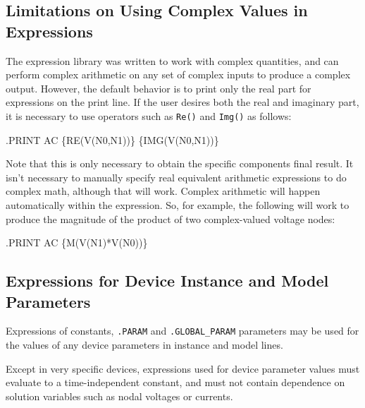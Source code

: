 \subsection{Limitations on Using Complex Values in Expressions}
\label{ComplexExpressions}
The \Xyce{} expression library was written to work with complex
quantities, and can perform complex arithmetic on any set of 
complex inputs to produce a complex output.
However, the default behavior is to print only the real part 
for expressions on the print line.  If the user desires both the
real and imaginary part, it is necessary to use operators 
such as \texttt{Re()} and \texttt{Img()} as follows:

\begin{vquote}
.PRINT AC  \{RE(V(N0,N1))\} \{IMG(V(N0,N1))\}
\end{vquote}

Note that this is only necessary to obtain the specific components 
final result.   It isn't necessary to manually specify real equivalent 
arithmetic expressions to do complex math, although that will work.  Complex 
arithmetic will happen automatically within the expression.  So, for example,
the following will work to produce the magnitude of the product of two 
complex-valued voltage nodes:

\begin{vquote}
.PRINT AC  \{M(V(N1)*V(N0))\}
\end{vquote}

\subsection{Expressions for Device Instance and Model Parameters}

Expressions of constants, \texttt{.PARAM} and \texttt{.GLOBAL\_PARAM} parameters may be used
for the values of any device parameters in instance and model lines.

Except in very specific devices, expressions used for device parameter
values must evaluate to a time-independent constant, and must not
contain dependence on solution variables such as nodal voltages or
currents.  

\begin{centering}
\end{centering}

